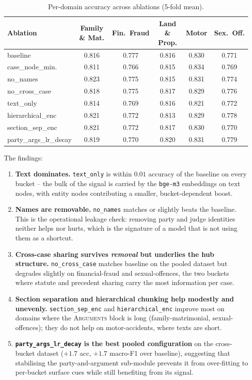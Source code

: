 \begin{table}[H]
  \centering
  \scriptsize
  \begin{tabular}{lccccc}
    \toprule
    Ablation & Family \& Mat. & Fin.\ Fraud & Land \& Prop. & Motor & Sex.\ Off. \\
    \midrule
    baseline          & 0.816 & 0.777 & 0.816 & 0.830 & 0.771 \\
    case\_node\_min.  & 0.811 & 0.766 & 0.815 & 0.834 & 0.769 \\
    no\_names         & 0.823 & 0.775 & 0.815 & 0.831 & 0.774 \\
    no\_cross\_case   & 0.818 & 0.775 & 0.817 & 0.829 & 0.776 \\
    text\_only        & 0.814 & 0.769 & 0.816 & 0.821 & 0.772 \\
    hierarchical\_enc & 0.821 & 0.772 & 0.813 & 0.829 & 0.778 \\
    section\_sep\_enc & 0.821 & 0.772 & 0.817 & 0.830 & 0.770 \\
    party\_args\_lr\_decay & 0.819 & 0.770 & 0.820 & 0.831 & 0.779 \\
    \bottomrule
  \end{tabular}
  \caption{Per-domain accuracy across ablations (5-fold mean).}
  \label{tab:ablation_per_domain}
\end{table}

The findings:

\begin{enumerate}
  \item \textbf{Text dominates.} \texttt{text\_only} is within
    $0.01$ accuracy of the baseline on every bucket -- the bulk of
    the signal is carried by the \texttt{bge-m3} embeddings on text
    nodes, with entity nodes contributing a smaller,
    bucket-dependent boost.
  \item \textbf{Names are removable.} \texttt{no\_names} matches or
    slightly beats the baseline. This is the operational leakage
    check: removing party and judge identities neither helps nor
    hurts, which is the signature of a model that is not using them
    as a shortcut.
  \item \textbf{Cross-case sharing survives \emph{removal} but
    underlies the hub structure.} \texttt{no\_cross\_case} matches
    baseline on the pooled dataset but degrades slightly on
    financial-fraud and sexual-offences, the two buckets where
    statute and precedent sharing carry the most information per case.
  \item \textbf{Section separation and hierarchical chunking help
    modestly and unevenly.}
    \texttt{section\_sep\_enc} and \texttt{hierarchical\_enc} improve
    most on domains where the \textsc{Arguments} block is long
    (family-matrimonial, sexual-offences); they do not help on
    motor-accidents, where texts are short.
  \item \textbf{\texttt{party\_args\_lr\_decay} is the best
    pooled configuration} on the cross-bucket dataset
    ($+1.7$ acc, $+1.7$ macro-F1 over baseline), suggesting that
    stabilising the party-and-argument sub-module prevents it from
    over-fitting to per-bucket surface cues while still benefiting from
    its signal.
\end{enumerate}

